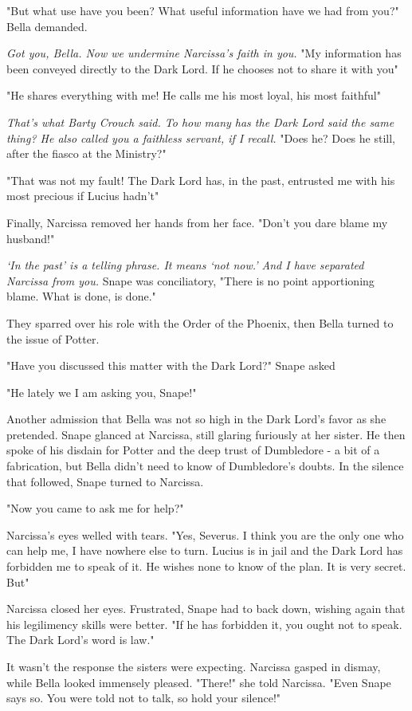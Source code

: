"But what use have you been? What useful information have we had from you?" Bella demanded.

\emph{Got you, Bella. Now we undermine Narcissa's faith in you.} "My information has been conveyed directly to the Dark Lord. If he chooses not to share it with you{\el}"

"He shares everything with me! He calls me his most loyal, his most faithful{\el}"

\emph{That's what Barty Crouch said. To how many has the Dark Lord said the same thing? He also called you a faithless servant, if I recall.} "Does he? Does he still, after the fiasco at the Ministry?"

"That was not my fault! The Dark Lord has, in the past, entrusted me with his most precious{\el} if Lucius hadn't{\el}"

Finally, Narcissa removed her hands from her face. "Don't you dare blame my husband!"

\emph{`In the past' is a telling phrase. It means `not now.' And I have separated Narcissa from you.} Snape was conciliatory, "There is no point apportioning blame. What is done, is done."

They sparred over his role with the Order of the Phoenix, then Bella turned to the issue of Potter.

"Have you discussed this matter with the Dark Lord?" Snape asked

"He{\el} lately we{\el} I am asking you, Snape!"

Another admission that Bella was not so high in the Dark Lord's favor as she pretended. Snape glanced at Narcissa, still glaring furiously at her sister. He then spoke of his disdain for Potter and the deep trust of Dumbledore - a bit of a fabrication, but Bella didn't need to know of Dumbledore's doubts. In the silence that followed, Snape turned to Narcissa.

"Now{\el} you came to ask me for help?"

Narcissa's eyes welled with tears. "Yes, Severus. I think you are the only one who can help me, I have nowhere else to turn. Lucius is in jail and{\el} the Dark Lord has forbidden me to speak of it. He wishes none to know of the plan. It is very{\el} secret. But{\el}"

Narcissa closed her eyes. Frustrated, Snape had to back down, wishing again that his legilimency skills were better. "If he has forbidden it, you ought not to speak. The Dark Lord's word is law."

It wasn't the response the sisters were expecting. Narcissa gasped in dismay, while Bella looked immensely pleased. "There!" she told Narcissa. "Even Snape says so. You were told not to talk, so hold your silence!"


